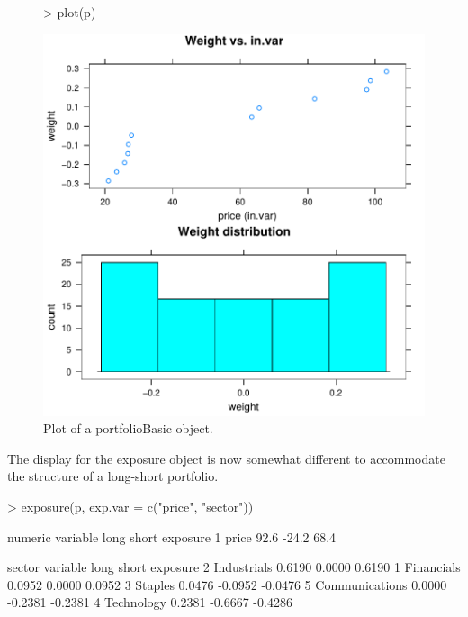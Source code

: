 \documentclass[a4paper]{report}
\begin{document}
\begin{article}
\begin{figure}
\centering
\vspace*{.1in}
\begin{Schunk}
\begin{Sinput}
> plot(p)
\end{Sinput}
\end{Schunk}
\includegraphics{portfolio-010}
\caption{\label{figure:plot.portfolio}
Plot of a portfolioBasic object.}
\end{figure}

The display for the exposure object is now somewhat different to
accommodate the structure of a long-short portfolio. 

\begin{Schunk}
\begin{Sinput}
> exposure(p, exp.var = c("price", "sector"))
\end{Sinput}
\begin{Soutput}
numeric 
  variable long short exposure
1    price 92.6 -24.2     68.4

sector 
        variable   long   short exposure
2    Industrials 0.6190  0.0000   0.6190
1     Financials 0.0952  0.0000   0.0952
3        Staples 0.0476 -0.0952  -0.0476
5 Communications 0.0000 -0.2381  -0.2381
4     Technology 0.2381 -0.6667  -0.4286
\end{Soutput}
\end{Schunk}


\end{article}
\end{document}
